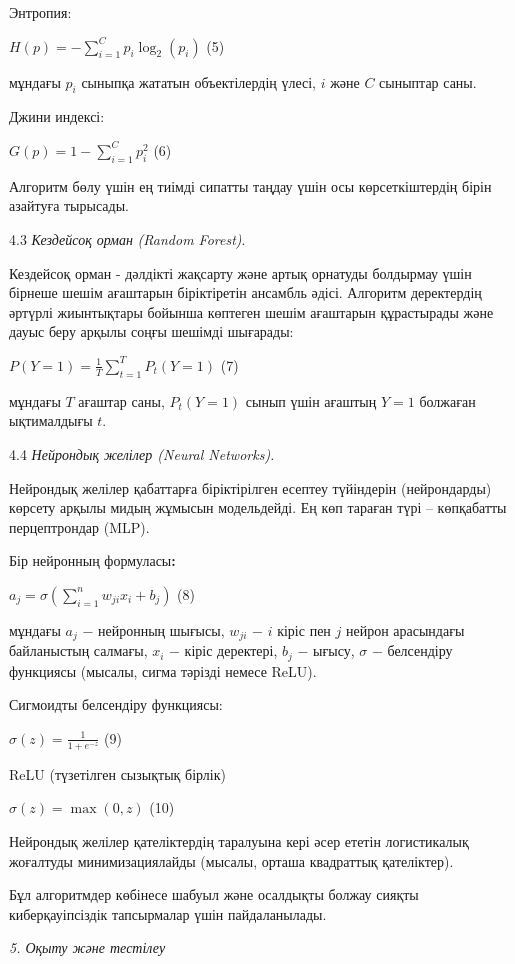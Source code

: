 \documentclass[
]{article}
\begin{document}
Энтропия:

\(H(p) = - \sum_{i = 1}^{C}{p_{i}\log_{2}(p_{i})}\) (5)

мұндағы \(p_{i}\) сыныпқа жататын объектілердің үлесі, \(i\) және \(C\)
сыныптар саны.

Джини индексі:

\(G(p) = 1 - \sum_{i = 1}^{C}p_{i}^{2}\) (6)

Алгоритм бөлу үшін ең тиімді сипатты таңдау үшін осы көрсеткіштердің
бірін азайтуға тырысады.

4.3 \emph{Кездейсоқ орман} \emph{(Random Forest)}.

Кездейсоқ орман - дәлдікті жақсарту және артық орнатуды болдырмау үшін
бірнеше шешім ағаштарын біріктіретін ансамбль әдісі. Алгоритм
деректердің әртүрлі жиынтықтары бойынша көптеген шешім ағаштарын
құрастырады және дауыс беру арқылы соңғы шешімді шығарады:

\(P(Y = 1) = \frac{1}{T}\sum_{t = 1}^{T}{P_{t}(Y = 1)}\) (7)

мұндағы \(T\) ағаштар саны, \(P_{t}(Y = 1)\) сынып үшін ағаштың
\(Y = 1\) болжаған ықтималдығы \(t\).

4.4 \emph{Нейрондық желілер (Neural Networks).}

Нейрондық желілер қабаттарға біріктірілген есептеу түйіндерін
(нейрондарды) көрсету арқылы мидың жұмысын модельдейді. Ең көп тараған
түрі -- көпқабатты перцептрондар (MLP).

Бір нейронның формуласы\textbf{:}

\(a_{j} = \sigma\left( \sum_{i = 1}^{n}{w_{ji}x_{i} + b_{j}} \right)\)
(8)

мұндағы \(a_{j}\) − нейронның шығысы, \(w_{ji}\) − \(i\) кіріс пен \(j\)
нейрон арасындағы байланыстың салмағы, \(x_{i}\) − кіріс деректері,
\(b_{j}\) − ығысу, \(\sigma\) − белсендіру функциясы (мысалы, сигма
тәрізді немесе ReLU).

Сигмоидты белсендіру функциясы:

\(\sigma(z) = \frac{1}{1 + e^{- z}}\) (9)

ReLU (түзетілген сызықтық бірлік)

\(\sigma(z) = \max(0,z)\) (10)

Нейрондық желілер қателіктердің таралуына кері әсер ететін логистикалық
жоғалтуды минимизациялайды (мысалы, орташа квадраттық қателіктер).

Бұл алгоритмдер көбінесе шабуыл және осалдықты болжау сияқты
киберқауіпсіздік тапсырмалар үшін пайдаланылады.

\emph{5. Оқыту және тестілеу}
\end{document}
